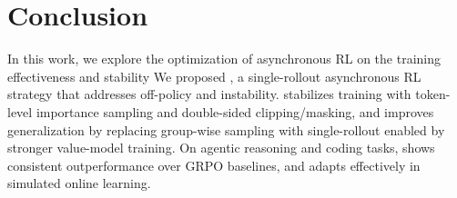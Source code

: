 


\section{Conclusion}

In this work, we explore the optimization of asynchronous RL on the training effectiveness and stability
We proposed \model, a single-rollout asynchronous RL strategy that addresses off-policy and instability. \model stabilizes training with token-level importance sampling and double-sided clipping/masking, and improves generalization by replacing group-wise sampling with single-rollout enabled by stronger value-model training. On agentic reasoning and coding tasks, \model shows consistent outperformance over GRPO baselines, and adapts effectively in simulated online learning.
